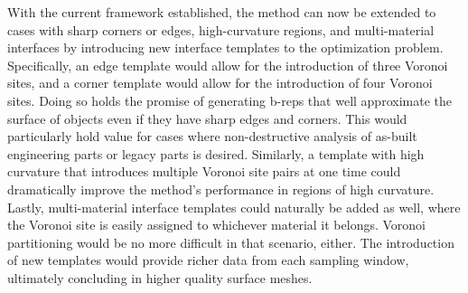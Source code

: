 With the current framework established, the method can now be extended to cases with sharp corners or edges, high-curvature regions, and multi-material interfaces by introducing new interface templates to the optimization problem. Specifically, an edge template would allow for the introduction of three Voronoi sites, and a corner template would allow for the introduction of four Voronoi sites. Doing so holds the promise of generating b-reps that well approximate the surface of objects even if they have sharp edges and corners. This would particularly hold value for cases where non-destructive analysis of as-built engineering parts or legacy parts is desired. Similarly, a template with high curvature that introduces multiple Voronoi site pairs at one time could dramatically improve the method's performance in regions of high curvature. Lastly, multi-material interface templates could naturally be added as well, where the Voronoi site is easily assigned to whichever material it belongs. Voronoi partitioning would be no more difficult in that scenario, either. The introduction of new templates would provide richer data from each sampling window, ultimately concluding in higher quality surface meshes.